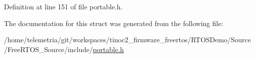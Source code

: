 Definition at line 151 of file portable.\+h.



The documentation for this struct was generated from the following file\+:\begin{DoxyCompactItemize}
\item 
/home/telemetria/git/workspaces/tinoc2\+\_\+firmware\+\_\+freertos/\+R\+T\+O\+S\+Demo/\+Source/\+Free\+R\+T\+O\+S\+\_\+\+Source/include/\hyperlink{portable_8h}{portable.\+h}\end{DoxyCompactItemize}
